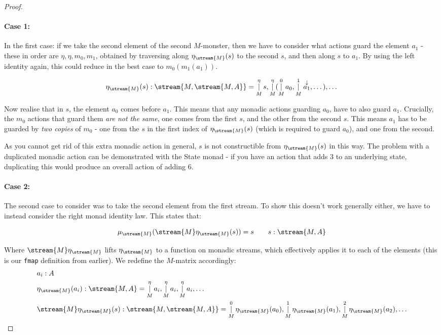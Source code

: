 \begin{proof}
\paragraph{Case 1:}

In the first case: if we take the second element of the second $M$-monster, then we have to consider what actions guard the element $a_1$ - these in order are $\eta, \eta, m_0, m_1$, obtained by traversing along $\eta_{\stream{M}}(s)$ to the second $s$, and then along $s$ to $a_1$. By using the left identity again, this could reduce in the best case to $m_0(m_1(a_1))$.

$$
\eta_{\stream{M}}(s) : \stream{M,\stream{M,A}} = \mathop{|}_M^\eta s, \mathop{|}_M^\eta (\mathop{|}_M^0 a_0, \mathop{|}_M^1 \stackrel{\downarrow}{a_1}, \dots), \dots
$$

Now realise that in $s$, the element $a_0$ comes before $a_1$. This means that any monadic actions guarding $a_0$, have to also guard $a_1$. Crucially, the $m_0$ actions that guard them \emph{are not the same}, one comes from the first $s$, and the other from the second $s$. This means $a_1$ has to be guarded by \emph{two copies} of $m_0$ - one from the $s$ in the first index of $\eta_{\stream{M}}(s)$ (which is required to guard $a_0$), and one from the second. 

As you cannot get rid of this extra monadic action in general, $s$ is not constructible from $\eta_{\stream{M}}(s)$ in this way. The problem with a duplicated monadic action can be demonstrated with the State monad - if you have an action that adds $3$ to an underlying state, duplicating this would produce an overall action of adding $6$.\\


\paragraph{Case 2:} 

The second case to consider was to take the second element from the first stream. To show this doesn't work generally either, we have to instead consider the right monad identity law. This states that:

$$
\mu_{\stream{M}}(\stream{M}\eta_{\stream{M}}(s)) = s
\qquad s : \stream{M,A}
$$

Where $\stream{M}\eta_{\stream{M}}$ lifts $\eta_{\stream{M}}$ to a function on monadic streams, which effectively applies it to each of the elements (this is our \verb+fmap+ definition from earlier). We redefine the $M$-matrix accordingly:
\begin{align*}
&a_i : A\\
&\eta_{\stream{M}}(a_i) : \stream{M,A} = \mathop{|}_M^\eta a_i, \mathop{|}_M^\eta a_i, \mathop{|}_M^\eta  a_i, \dots\\
&\stream{M}\eta_{\stream{M}}(s) : \stream{M,\stream{M,A}} = \mathop{|}_M^0 \eta_{\stream{M}}(a_0), \mathop{|}_M^1 \eta_{\stream{M}}(a_1), \mathop{|}_M^2 \eta_{\stream{M}}(a_2), \dots
\end{align*}


\end{proof}
